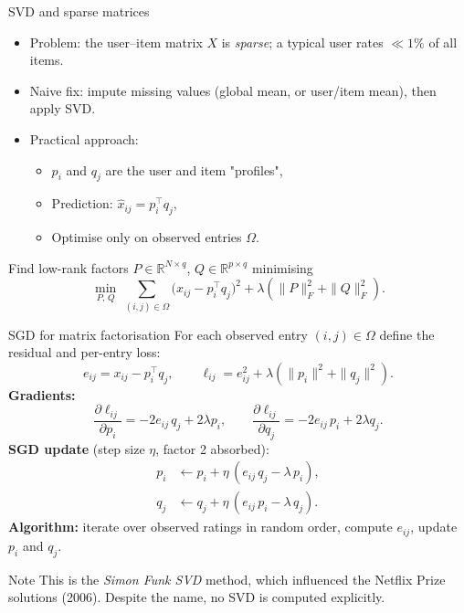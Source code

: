 \documentclass[aspectratio=169,t]{beamer}
\begin{document}

\begin{frame}{SVD and sparse matrices}
  \begin{itemize}
    \item Problem: the user–item matrix $X$ is \emph{sparse}; a typical user rates $\ll 1\%$ of all items.
    \item Naive fix: impute missing values (global mean, or user/item mean), then apply SVD.
    \item Practical approach:
    \begin{itemize}
      \item $p_i$ and $q_j$ are the user and item "profiles",
      \item Prediction: $\hat x_{ij} = p_i^\top q_j$,
      \item Optimise only on observed entries $\Omega$.
    \end{itemize}
  \end{itemize}
  \vspace{0.2cm}

  Find low-rank factors $P \in \mathbb{R}^{N\times q}$, $Q \in \mathbb{R}^{p\times q}$ minimising
  $$\min_{P,\,Q}\ \sum_{(i,j)\in\Omega} \bigl(x_{ij} - p_i^\top q_j\bigr)^2 + \lambda\!\left(\|P\|_F^2 + \|Q\|_F^2\right).$$
\end{frame}

\begin{frame}{SGD for matrix factorisation}
  For each observed entry $(i,j)\in\Omega$ define the residual and per-entry loss:
  $$e_{ij} = x_{ij} - p_i^\top q_j, \qquad \ell_{ij} = e_{ij}^2 + \lambda(\|p_i\|^2 + \|q_j\|^2).$$
  \textbf{Gradients:}
  $$\frac{\partial \ell_{ij}}{\partial p_i} = -2e_{ij}\,q_j + 2\lambda p_i, \qquad
    \frac{\partial \ell_{ij}}{\partial q_j} = -2e_{ij}\,p_i + 2\lambda q_j.$$
  \textbf{SGD update} (step size $\eta$, factor 2 absorbed):
  \begin{align*}
    p_i &\leftarrow p_i + \eta\,(e_{ij}\,q_j - \lambda\, p_i),\\
    q_j &\leftarrow q_j + \eta\,(e_{ij}\,p_i - \lambda\, q_j).
  \end{align*}
  \vspace{0.1cm}
  \textbf{Algorithm:} iterate over observed ratings in random order, compute $e_{ij}$, update $p_i$ and $q_j$.

  \begin{block}{Note}
    This is the \emph{Simon Funk SVD} method, which influenced the Netflix Prize solutions (2006). Despite the name, no SVD is computed explicitly.
  \end{block}
\end{frame}
\end{document}
